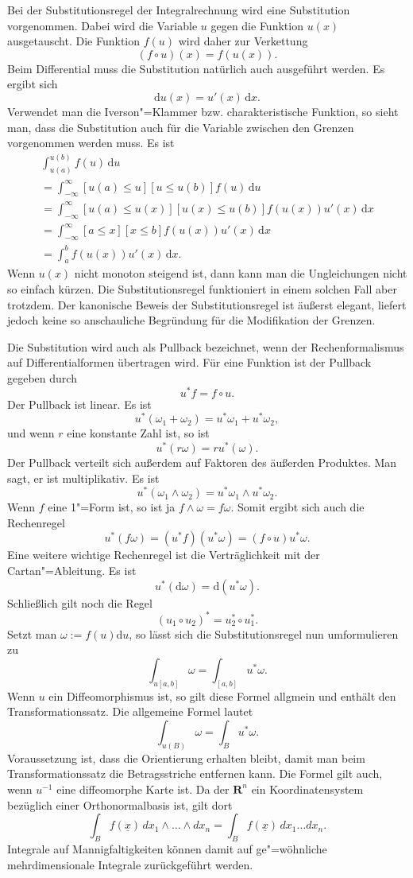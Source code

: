 \documentclass[a4paper,10pt,fleqn,twocolumn,twoside]{article}
\begin{document}
Bei der Substitutionsregel der Integralrechnung wird eine
Substitution vorgenommen. Dabei wird die Variable \(u\) gegen die Funktion
\(u(x)\) ausgetauscht. Die Funktion \(f(u)\) wird daher zur
Verkettung
\[(f\circ u)(x) = f(u(x)).\]
Beim Differential muss die Substitution natürlich auch ausgeführt
werden. Es ergibt sich
\[\mathrm du(x) = u'(x)\,\mathrm dx.\]
Verwendet man die Iverson"=Klammer bzw. charakteristische Funktion,
so sieht man, dass die Substitution auch für die Variable zwischen
den Grenzen vorgenommen werden muss. Es ist
\begin{gather*}
\int_{u(a)}^{u(b)} f(u)\,\mathrm du\\
= \int_{-\infty}^{\infty} [u(a)\le u][u\le u(b)] f(u)\,\mathrm du\\
= \int_{-\infty}^{\infty} [u(a)\le u(x)][u(x) \le u(b)] f(u(x))u'(x)\,\mathrm dx\\
= \int_{-\infty}^{\infty} [a\le x][x\le b] f(u(x)) u'(x)\,\mathrm dx\\
= \int_a^b f(u(x))u'(x)\,\mathrm dx.
\end{gather*}
Wenn \(u(x)\) nicht monoton steigend ist, dann kann man die
Ungleichungen nicht so einfach kürzen. Die Substitutionsregel
funktioniert in einem solchen Fall aber trotzdem. Der kanonische
Beweis der Substitutionsregel ist äußerst elegant, liefert jedoch
keine so anschauliche Begründung für die Modifikation der Grenzen.

Die Substitution wird auch als Pullback bezeichnet, wenn der
Rechenformalismus auf Differentialformen übertragen wird. Für
eine Funktion ist der Pullback gegeben durch
\[u^{*}f = f\circ u.\]
Der Pullback ist linear. Es ist
\[u^{*}(\omega_1+\omega_2)
= u^{*}\omega_1+u^{*}\omega_2,\]
und wenn \(r\) eine konstante Zahl ist, so ist
\[u^{*}(r\omega) = ru^{*}(\omega).\]
Der Pullback verteilt sich außerdem auf Faktoren des
äußerden Produktes. Man sagt, er ist multiplikativ. Es ist
\[u^{*}(\omega_1\wedge\omega_2)
= u^{*}\omega_1\wedge u^{*}\omega_2.\]
Wenn \(f\) eine 1"=Form ist, so ist ja \(f\wedge\omega = f\omega.\)
Somit ergibt sich auch die Rechenregel
\[u^{*}(f\omega) = (u^{*}f)(u^{*}\omega)
= (f\circ u)u^{*}\omega.\] 
Eine weitere wichtige Rechenregel ist die Verträglichkeit
mit der Cartan"=Ableitung. Es ist
\[u^{*}(\mathrm d\omega) = \mathrm d(u^{*}\omega).\]
Schließlich gilt noch die Regel
\[(u_1\circ u_2)^{*} = u_2^{*}\circ u_1^{*}.\]
Setzt man \(\omega:=f(u)\mathrm du\), so lässt sich die
Substitutionsregel nun umformulieren zu
\[\int_{u[a,b]} \omega = \int_{[a,b]} u^{*}\omega.\]
Wenn \(u\) ein Diffeomorphismus ist, so gilt diese Formel
allgmein und enthält den Transformationssatz. Die allgemeine Formel
lautet
\[\int_{u(B)} \omega = \int_{B} u^{*}\omega.\]
Voraussetzung ist, dass die Orientierung erhalten bleibt, damit man
beim Transformationssatz die Betragsstriche entfernen kann.
Die Formel gilt auch, wenn \(u^{-1}\) eine diffeomorphe Karte ist.
Da der \(\mathbf R^n\) ein Koordinatensystem bezüglich einer
Orthonormalbasis ist, gilt dort
\[\int_B f(\underline x)\, dx_1\wedge\ldots\wedge dx_n
= \int_B f(\underline x)\, dx_1\ldots dx_n.\]
Integrale auf Mannigfaltigkeiten können damit auf ge"=wöhnliche
mehrdimensionale Integrale zurückgeführt werden.
\end{document}

